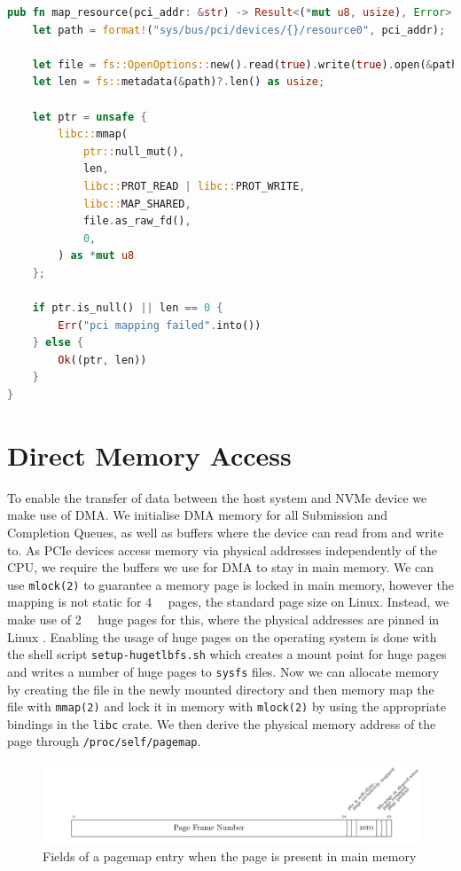 \begin{lstlisting}[float, language=Rust,label=lst:mmap,caption=Memory mapping a PCIe resource in Rust]
pub fn map_resource(pci_addr: &str) -> Result<(*mut u8, usize), Error> {
    let path = format!("sys/bus/pci/devices/{}/resource0", pci_addr);

    let file = fs::OpenOptions::new().read(true).write(true).open(&path)?;
    let len = fs::metadata(&path)?.len() as usize;

    let ptr = unsafe {
        libc::mmap(
            ptr::null_mut(),
            len,
            libc::PROT_READ | libc::PROT_WRITE,
            libc::MAP_SHARED,
            file.as_raw_fd(),
            0,
        ) as *mut u8
    };

    if ptr.is_null() || len == 0 {
        Err("pci mapping failed".into())
    } else {
        Ok((ptr, len))
    }
}
\end{lstlisting}

\section{Direct Memory Access}
To enable the transfer of data between the host system and NVMe device we make use of DMA. We initialise DMA memory for all Submission and Completion Queues, as well as buffers where the device can read from and write to.
As PCIe devices access memory via physical addresses independently of the CPU, we require the buffers we use for DMA to stay in main memory. We can use \texttt{mlock(2)} to guarantee a memory page is locked in main memory, however the mapping is not static for \qty{4}{\kibi\byte} pages, the standard page size on Linux. Instead, we make use of \qty{2}{\mebi\byte} huge pages for this, where the physical addresses are pinned in Linux \cite{user_space_net}.
Enabling the usage of huge pages on the operating system is done with the shell script \texttt{setup-hugetlbfs.sh} which creates a mount point for huge pages and writes a number of huge pages to \texttt{sysfs} files. Now we can allocate memory by creating the file in the newly mounted directory and then memory map the file with \texttt{mmap(2)} and lock it in memory with \texttt{mlock(2)} by using the appropriate bindings in the \texttt{libc} crate. We then derive the physical memory address of the page through \texttt{/proc/self/pagemap}.

\begin{figure}[H]
  \centering
    \includegraphics[width=\textwidth]{figures/pagemap}
    \caption{Fields of a pagemap entry when the page is present in main memory}
    \label{fig:pagemap}
\end{figure}

